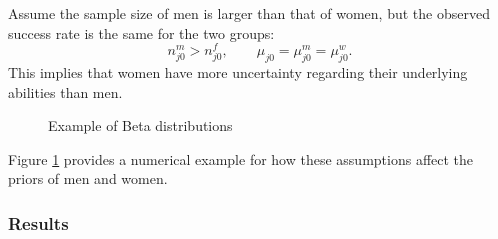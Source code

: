 \documentclass[10 pt]{article}
\newcommand{\pr}[1]{\left( #1 \right)}
\begin{document}
\begin{blist}
\item
Assume the sample size of men is larger than that of women, but the observed success rate is the same for the two groups:
\begin{equation*}
  n_{j0}^m > n_{j0}^f, \quad \quad \mu_{j0} = \mu_{j0}^m = \mu_{j0}^w.
\end{equation*}
This implies that women have more uncertainty regarding their underlying abilities than men.  
\begin{figure}[htb]
\begin{center}

\end{center}
\caption{Example of Beta distributions}
\label{beta_distribution}
\end{figure}
Figure \ref{beta_distribution} provides a numerical example for how these assumptions affect the priors of men and women. 






\end{blist}

\subsubsection{Results}
\end{document}
